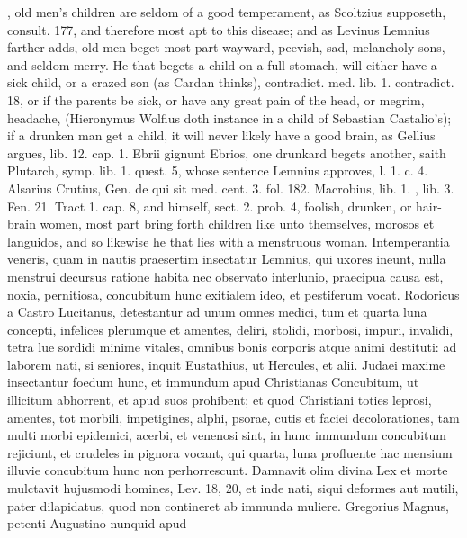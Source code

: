 {{, old men's children
are seldom of a good temperament, as Scoltzius supposeth, consult. 177,
and therefore most apt to this disease; and as Levinus Lemnius
farther adds, old men beget most part wayward, peevish, sad, melancholy
sons, and seldom merry. He that begets a child on a full stomach, will
either have a sick child, or a crazed son (as Cardan thinks),
contradict. med. lib. 1. contradict. 18, or if the parents be sick, or
have any great pain of the head, or megrim, headache, (Hieronymus
Wolfius doth instance in a child of Sebastian Castalio's); if a
drunken man get a child, it will never likely have a good brain, as
Gellius argues, lib. 12. cap. 1. Ebrii gignunt Ebrios, one drunkard
begets another, saith Plutarch, symp. lib. 1. quest. 5, whose
sentence Lemnius approves, l. 1. c. 4. Alsarius Crutius, Gen. de
qui sit med. cent. 3. fol. 182. Macrobius, lib. 1. \Avicenna{}, lib. 3.
Fen. 21. Tract 1. cap. 8, and \Aristotle himself, sect. 2. prob. 4,
foolish, drunken, or hair-brain women, most part bring forth children
like unto themselves, morosos et languidos, and so likewise he that
lies with a menstruous woman. Intemperantia veneris, quam in nautis
praesertim insectatur  Lemnius, qui uxores ineunt, nulla menstrui
decursus ratione habita nec observato interlunio, praecipua causa est,
noxia, pernitiosa, concubitum hunc exitialem ideo, et pestiferum vocat.
Rodoricus a Castro Lucitanus, detestantur ad unum omnes medici,
tum et quarta luna concepti, infelices plerumque et amentes, deliri,
stolidi, morbosi, impuri, invalidi, tetra lue sordidi minime vitales,
omnibus bonis corporis atque animi destituti: ad laborem nati, si
seniores, inquit Eustathius, ut Hercules, et alii. Judaei maxime
insectantur foedum hunc, et immundum apud Christianas Concubitum, ut
illicitum abhorrent, et apud suos prohibent; et quod Christiani toties
leprosi, amentes, tot morbili, impetigines, alphi, psorae, cutis et
faciei decolorationes, tam multi morbi epidemici, acerbi, et venenosi
sint, in hunc immundum concubitum rejiciunt, et crudeles in pignora
vocant, qui quarta, luna profluente hac mensium illuvie concubitum hunc
non perhorrescunt. Damnavit olim divina Lex et morte mulctavit
hujusmodi homines, Lev. 18, 20, et inde nati, siqui deformes aut
mutili, pater dilapidatus, quod non contineret ab  immunda
muliere. Gregorius Magnus, petenti Augustino nunquid apud
}}
